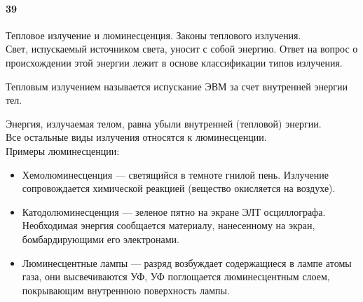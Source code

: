


\paragraph{39} Тепловое излучение и люминесценция. Законы теплового излучения.\\

Свет, испускаемый источником света, уносит с собой энергию. Ответ на вопрос о происхождении этой энергии лежит в основе классификации типов излучения. \\
\begin{definition}
Тепловым излучением называется испускание ЭВМ за счет внутренней энергии  тел.
\end{definition}
Энергия, излучаемая телом, равна убыли внутренней (тепловой) энергии.\\
Все остальные виды излучения относятся к люминесценции.\\
Примеры люминесценции:
\begin{itemize}
	\item Хемолюминесценция --- светящийся в темноте гнилой пень. Излучение сопровождается химической реакцией (вещество окисляется на воздухе).
	\item Катодолюминесценция --- зеленое пятно на экране ЭЛТ осциллографа. Необходимая энергия сообщается материалу, нанесенному на экран, бомбардирующими его электронами.
	\item Люминесцентные лампы --- разряд возбуждает содержащиеся в лампе атомы газа, они высвечиваются УФ, УФ поглощается люминесцентным слоем, покрывающим внутреннюю поверхность лампы.
\end{itemize}

